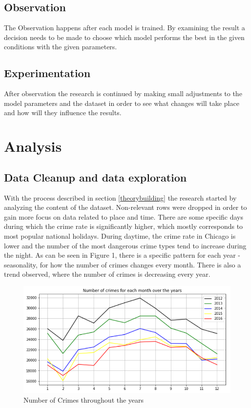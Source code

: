 \documentclass[a4paper, twocolumn]{article}
\begin{document}
\subsection{Observation}
\label{observation}
    The Observation happens after each model is trained. By examining the result a decision needs to be made
    to choose  which model performs the best in the given conditions with the given parameters.
\subsection{Experimentation}
\label{experimentation}
    After observation the research is continued by making small adjustments to the model parameters and the dataset
    in order to see what changes will take place and how will they influence the results.

\section{Analysis}
\subsection{Data Cleanup and data exploration}
With the process described in section \ref{theorybuilding} the research started by analyzing the content of the dataset. 
Non-relevant rows were dropped in order to gain more focus on data related to place and time. 
There are some specific days during which the crime rate is significantly higher, which mostly corresponds to most popular national holidays. 
During daytime, the crime rate in Chicago is lower and the number of the most dangerous crime types tend to increase during the night. 
As can be seen in Figure 1, there is a specific pattern for each year - seasonality, for how the number of crimes changes every month. 
There is also a trend observed, where the number of crimes is decreasing every year. 
\begin{figure}
    \includegraphics[scale=0.3]{fig1.png}

    \caption{Number of Crimes throughout the years}
\end{figure}
\end{document}
